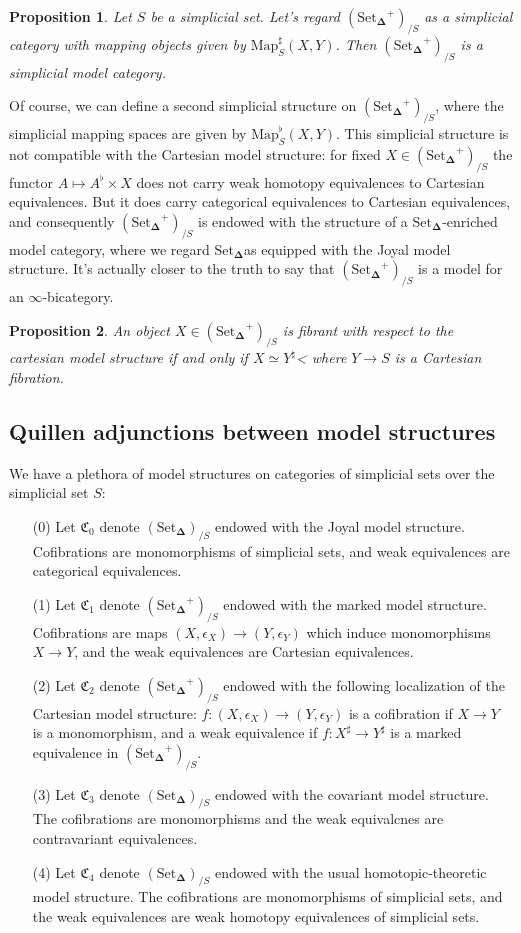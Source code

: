 \documentclass[12pt]{amsart}
\newcommand{\8}{\ensuremath{\infty}}
\newcommand{\C}{\ensuremath{\mathfrak{C}}}
\newcommand{\SSet}{\ensuremath{\text{Set}_{\boldsymbol{\Delta}}}}
\newcommand{\Map}{\ensuremath{\text{Map}}}
\newtheorem{proposition}{Proposition}
\begin{document}
{{\begin{proposition}
  Let $S$ be a simplicial set. Let's regard $(\SSet^+)_{/S}$ as a simplicial category with mapping objects given by $\Map^\sharp_S(X, Y)$. Then $(\SSet^+)_{/S}$ is a simplicial model category.
\end{proposition}

Of course, we can define a second simplicial structure on $(\SSet^+)_{/S}$, where the simplicial mapping spaces are given by $\Map^\flat_S(X, Y)$. This simplicial structure is not compatible with the Cartesian model structure: for fixed $X \in (\SSet^+)_{/S}$ the functor $A\mapsto A^\flat\times X$ does not carry weak homotopy equivalences to Cartesian equivalences. But it does carry categorical equivalences to Cartesian equivalences, and consequently $(\SSet^+)_{/S}$ is endowed with the structure of a \SSet-enriched model category, where we regard \SSet as equipped with the Joyal model structure. It's actually closer to the truth to say that $(\SSet^+)_{/S}$ is a model for an \8-bicategory.


\begin{proposition}
  An object $X \in (\SSet^+)_{/S}$ is fibrant with respect to the cartesian model structure if and only if $X\simeq Y^\natural$< where $Y \rightarrow S$ is a Cartesian fibration.
\end{proposition}

\subsection{Quillen adjunctions between model structures}

We have a plethora of model structures on categories of simplicial sets over the simplicial set $S$:

\begin{itemize}
  \item[(0)] Let $\C_0$ denote $(\SSet)_{/S}$ endowed with the Joyal model structure. Cofibrations are monomorphisms of simplicial sets, and weak equivalences are categorical equivalences.
  \item[(1)]  Let $\C_1$ denote $(\SSet^+)_{/S}$ endowed with the marked model structure. Cofibrations are maps $(X, \epsilon_X) \rightarrow (Y, \epsilon_Y)$ which induce monomorphisms $X \rightarrow Y$, and the weak equivalences are Cartesian equivalences.
  \item[(2)]  Let $\C_2$ denote $(\SSet^+)_{/S}$ endowed with the following localization of the Cartesian model structure: $f : (X, \epsilon_X) \rightarrow (Y, \epsilon_Y)$ is a cofibration if $X \rightarrow Y$ is a monomorphism, and a weak equivalence if $f : X^\sharp \rightarrow Y^\sharp$ is a marked equivalence in $(\SSet^+)_{/S}$.
  \item[(3)]  Let $\C_3$ denote $(\SSet)_{/S}$ endowed with the covariant model structure. The cofibrations are monomorphisms and the weak equivalcnes are contravariant equivalences.
  \item[(4)] Let $\C_4$ denote $(\SSet)_{/S}$ endowed with the usual homotopic-theoretic model structure. The cofibrations are monomorphisms of simplicial sets, and the weak equivalences are weak homotopy equivalences of simplicial sets.
\end{itemize}

}}
\end{document}
